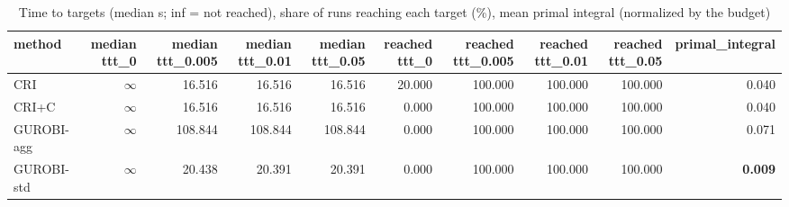 \begin{table}[htbp]
\centering
\small
\caption{Time to targets (median s; inf = not reached), share of runs reaching each target (\%), mean primal integral (normalized by the budget)}
\label{tab:E3x_long_runs_xlarge_b600_ttt}
\begin{tabular}{lrrrrrrrrr}
\toprule
method & median ttt\_0 & median ttt\_0.005 & median ttt\_0.01 & median ttt\_0.05 & reached ttt\_0 & reached ttt\_0.005 & reached ttt\_0.01 & reached ttt\_0.05 & primal\_integral \\
\midrule
CRI & $\infty$ & 16.516 & 16.516 & 16.516 & 20.000 & 100.000 & 100.000 & 100.000 & 0.040 \\
CRI+C & $\infty$ & 16.516 & 16.516 & 16.516 & 0.000 & 100.000 & 100.000 & 100.000 & 0.040 \\
GUROBI-agg & $\infty$ & 108.844 & 108.844 & 108.844 & 0.000 & 100.000 & 100.000 & 100.000 & 0.071 \\
GUROBI-std & $\infty$ & 20.438 & 20.391 & 20.391 & 0.000 & 100.000 & 100.000 & 100.000 & \textbf{0.009} \\
\bottomrule
\end{tabular}
\end{table}

